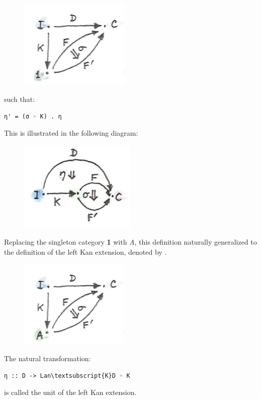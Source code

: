 \begin{figure}[H]
\centering
\includegraphics[width=2.08333in]{images/kan14.jpg}
\end{figure}

\noindent
such that:

\begin{verbatim}
η' = (σ ◦ K) . η
\end{verbatim}
This is illustrated in the following diagram:

\begin{figure}[H]
\centering
\includegraphics[width=2.19792in]{images/kan112.jpg}
\end{figure}

\noindent
Replacing the singleton category \textbf{1} with \emph{A}, this
definition naturally generalized to the definition of the left Kan
extension, denoted by .

\begin{figure}[H]
\centering
\includegraphics[width=2.06250in]{images/kan12.jpg}
\end{figure}

\noindent
The natural transformation:

\begin{Verbatim}[commandchars=\\\{\}]
η :: D -> Lan\textsubscript{K}D ◦ K
\end{Verbatim}
is called the unit of the left Kan extension.

